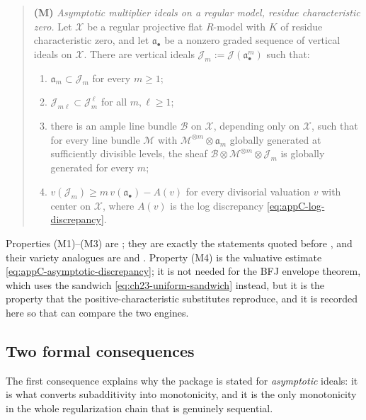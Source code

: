 \begin{quote}
\textbf{(M)} \emph{Asymptotic multiplier ideals on a regular model, residue
characteristic zero.}  Let $\mathcal X$ be a regular projective flat
$R$-model with $K$ of residue characteristic zero, and let
$\mathfrak a_\bullet$ be a nonzero graded sequence of vertical ideals on
$\mathcal X$.  There are vertical ideals
$\mathcal J_m:=\mathcal J(\mathfrak a_\bullet^m)$ such that:
\begin{enumerate}
\item[(M1)] $\mathfrak a_m\subset\mathcal J_m$ for every $m\geq1$;
\item[(M2)] $\mathcal J_{m\ell}\subset\mathcal J_m^{\,\ell}$ for all
$m,\ell\geq1$;
\item[(M3)] there is an ample line bundle $\mathcal B$ on
$\mathcal X$, depending only on $\mathcal X$, such that for every line
bundle $\mathcal M$ with $\mathcal M^{\otimes m}\otimes\mathfrak a_m$
globally generated at sufficiently divisible levels, the sheaf
$\mathcal B\otimes\mathcal M^{\otimes m}\otimes\mathcal J_m$ is globally
generated for every $m$;
\item[(M4)] $v(\mathcal J_m)\geq m\,v(\mathfrak a_\bullet)-A(v)$ for every
divisorial valuation $v$ with center on $\mathcal X$, where $A(v)$ is
the log discrepancy \eqref{eq:appC-log-discrepancy}.
\end{enumerate}
\end{quote}

Properties (M1)--(M3) are \cite[Theorem~B.8 and Remark~B.9]{BFJ16}; they are
exactly the statements quoted before
, and their variety analogues are
 and
.  Property (M4) is the
valuative estimate \eqref{eq:appC-asymptotic-discrepancy}; it is not needed
for the BFJ envelope theorem, which uses the sandwich
\eqref{eq:ch23-uniform-sandwich} instead, but it is the property that the
positive-characteristic substitutes reproduce, and it is recorded here so
that  can compare the two engines.

\subsection{Two formal consequences}

The first consequence explains why the package is stated for
\emph{asymptotic} ideals: it is what converts subadditivity into
monotonicity, and it is the only monotonicity in the whole regularization
chain that is genuinely sequential.

